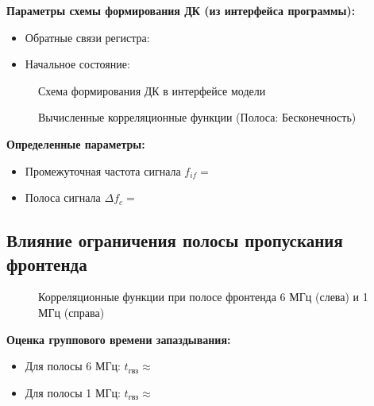 \textbf{Параметры схемы формирования ДК (из интерфейса программы):}
\begin{itemize}
    \item Обратные связи регистра: %
    \item Начальное состояние: %
\end{itemize}

\begin{figure}[H]
    \centering
    \caption{Схема формирования ДК в интерфейсе модели}
\end{figure}

\begin{figure}[H]
    \centering
    \caption{Вычисленные корреляционные функции (Полоса: Бесконечность)}
\end{figure}

\textbf{Определенные параметры:}
\begin{itemize}
    \item Промежуточная частота сигнала $f_{if} = $ %
    \item Полоса сигнала $\Delta f_c = $ %
\end{itemize}

\subsection{Влияние ограничения полосы пропускания фронтенда}

\begin{figure}[H]
    \centering
    \caption{Корреляционные функции при полосе фронтенда 6 МГц (слева) и 1 МГц (справа)}
\end{figure}

\textbf{Оценка группового времени запаздывания:}
\begin{itemize}
    \item Для полосы 6 МГц: $t_{гвз} \approx $ %
    \item Для полосы 1 МГц: $t_{гвз} \approx $ %
\end{itemize}

